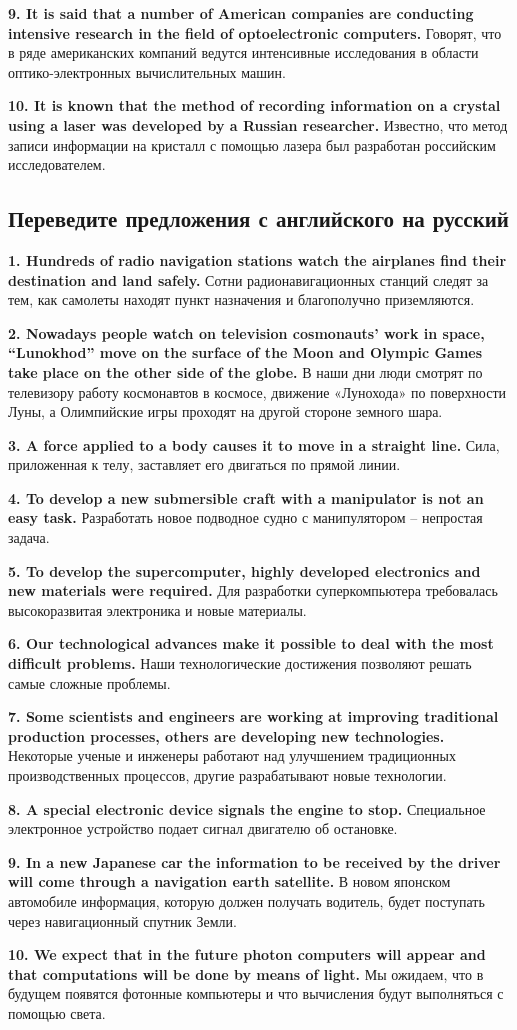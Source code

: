 \textbf{9. It is said that a number of American companies are conducting intensive research in the field of optoelectronic computers.}
Говорят, что в ряде американских компаний ведутся интенсивные исследования в области оптико-электронных вычислительных машин.

\textbf{10. It is known that the method of recording information on a crystal using a laser was developed by a Russian researcher.}
Известно, что метод записи информации на кристалл с помощью лазера был разработан российским исследователем.

\subsection{Переведите предложения с английского на русский}
\textbf{1. Hundreds of radio navigation stations watch the airplanes find their destination and land safely.}
Сотни радионавигационных станций следят за тем, как самолеты находят пункт назначения и благополучно приземляются.

\textbf{2. Nowadays people watch on television cosmonauts' work in space, ``Lunokhod'' move on the surface of the Moon and Olympic Games take place on the other side of the globe.}
В  наши дни люди смотрят по телевизору работу космонавтов в космосе, движение «Лунохода» по поверхности Луны, а Олимпийские игры проходят на другой стороне земного шара.

\textbf{3. A force applied to a body causes it to move in a straight line.}
Сила, приложенная к телу, заставляет его двигаться по прямой линии.

\textbf{4. To develop a new submersible craft with a manipulator is not an easy task.}
Разработать новое подводное судно с манипулятором -- непростая задача.

\textbf{5. To develop the supercomputer, highly developed electronics and new materials were required.}
Для разработки суперкомпьютера требовалась высокоразвитая электроника и новые материалы.

\textbf{6. Our technological advances make it possible to deal with the most difficult problems.}
Наши технологические достижения позволяют решать самые сложные проблемы.

\textbf{7. Some scientists and engineers are working at improving traditional production processes, others are developing new technologies.}
Некоторые ученые и инженеры работают над улучшением традиционных производственных процессов, другие разрабатывают новые технологии.

\textbf{8. A special electronic device signals the engine to stop.}
Специальное электронное устройство подает сигнал двигателю об остановке.

\textbf{9. In a new Japanese car the information to be received by the driver will come through a navigation earth satellite.}
В новом японском автомобиле информация, которую должен получать водитель, будет поступать через навигационный спутник Земли.

\textbf{10. We expect that in the future photon computers will appear and that computations will be
done by means of light.}
Мы ожидаем, что в будущем появятся фотонные компьютеры и что вычисления будут выполняться с помощью света.